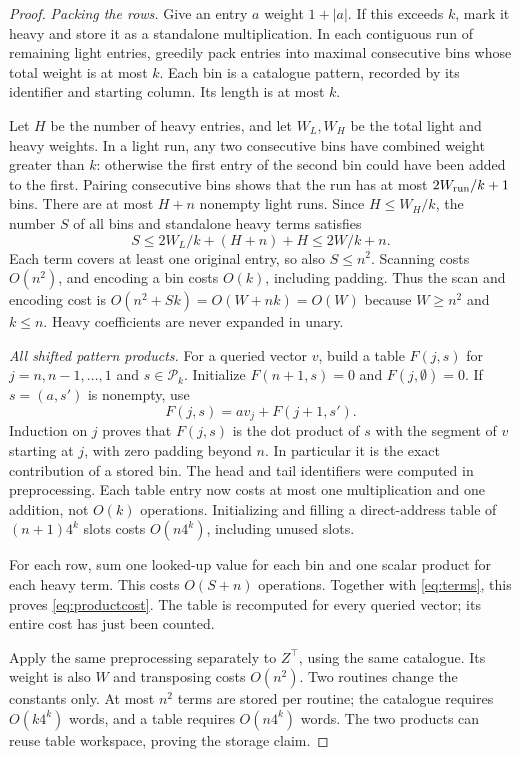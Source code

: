 \documentclass[11pt,a4paper]{article}
\theoremstyle{remark}
\begin{document}
\begin{proof}
\textit{Packing the rows.}
Give an entry $a$ weight $1+|a|$. If this exceeds $k$, mark it heavy and
store it as a standalone multiplication. In each contiguous run of remaining
light entries, greedily pack entries into maximal consecutive bins whose total
weight is at most $k$. Each bin is a catalogue pattern, recorded by its
identifier and starting column. Its length is at most $k$.

Let $H$ be the number of heavy entries, and let $W_L,W_H$ be the total light
and heavy weights. In a light run, any two consecutive bins have combined
weight greater than $k$: otherwise the first entry of the second bin could
have been added to the first. Pairing consecutive bins shows that the run has
at most $2W_{\rm run}/k+1$ bins. There are at most $H+n$ nonempty light runs.
Since $H\le W_H/k$, the number $S$ of all bins and standalone heavy terms
satisfies
\begin{equation}\label{eq:terms}
 S\le2W_L/k+(H+n)+H\le2W/k+n.
\end{equation}
Each term covers at least one original entry, so also $S\le n^2$.
Scanning costs $O(n^2)$, and encoding a bin costs $O(k)$, including padding.
Thus the scan and encoding cost is
$O(n^2+Sk)=O(W+nk)=O(W)$ because $W\ge n^2$ and $k\le n$.
Heavy coefficients are never expanded in unary.

\textit{All shifted pattern products.}
For a queried vector $v$, build a table $F(j,s)$ for
$j=n,n-1,\ldots,1$ and $s\in\mathcal P_k$. Initialize
$F(n+1,s)=0$ and $F(j,\emptyset)=0$. If $s=(a,s')$ is nonempty, use
\begin{equation}\label{eq:table}
 F(j,s)=a v_j+F(j+1,s').
\end{equation}
Induction on $j$ proves that $F(j,s)$ is the dot product of $s$ with the
segment of $v$ starting at $j$, with zero padding beyond $n$.
In particular it is the exact contribution of a stored bin.
The head and tail identifiers were computed in preprocessing. Each table
entry now costs at most one multiplication and one addition, not $O(k)$
operations. Initializing and filling a direct-address table of
$(n+1)4^k$ slots costs $O(n4^k)$, including unused slots.

For each row, sum one looked-up value for each bin and one scalar product
for each heavy term. This costs $O(S+n)$ operations. Together with
\eqref{eq:terms}, this proves \eqref{eq:productcost}. The table is recomputed
for every queried vector; its entire cost has just been counted.

Apply the same preprocessing separately to $Z^\top$, using the same
catalogue. Its weight is also $W$ and transposing costs $O(n^2)$. Two routines
change the constants only. At most $n^2$ terms are stored per routine; the
catalogue requires $O(k4^k)$ words, and a table requires $O(n4^k)$ words.
The two products can reuse table workspace, proving the storage claim.
\end{proof}
\end{document}
